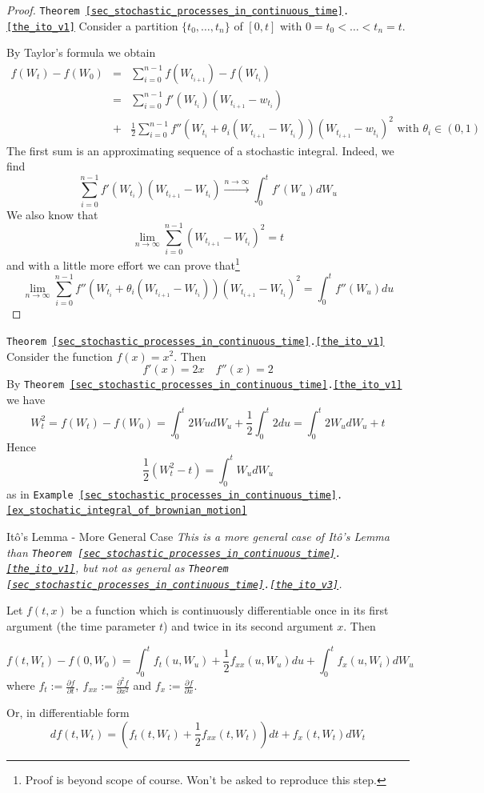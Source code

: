\documentclass[11pt,a4paper]{article}
\begin{document}
  \begin{proof}{\texttt{Theorem \ref{sec_stochastic_processes_in_continuous_time}.\ref{the_ito_v1}}}
    Consider a partition $\{t_0,\dots,t_n\}$ of $[0,t]$ with $0=t_0<\dots<t_n=t$.
    \par By Taylor's formula we obtain
    \[\begin{array}{rcl}
      f(W_t)-f(W_0)&=&\sum_{i=0}^{n-1}f(W_{t_{i+1}})-f(W_{t_i})\\
      &=&\sum_{i=0}^{n-1}f'(W_{t_i})(W_{t_{i+1}}-w_{t_i})\\
      &+&\frac12\sum_{i=0}^{n-1}f''(W_{t_i}+\theta_i(W_{t_{i+1}}-W_{t_i}))(W_{t_{i+1}}-w_{t_i})^2\text{ with }\theta_i\in(0,1)
    \end{array}\]
    The first sum is an approximating sequence of a stochastic integral. Indeed, we find
    \[ \sum_{i=0}^{n-1}f'(W_{t_i})(W_{t_{i+1}}-W_{t_i})\overset{n\to\infty}\longrightarrow\int_0^tf'(W_u)dW_u \]
    We also know that
    \[ \lim_{n\to\infty}\sum_{i=0}^{n-1}(W_{t_{i+1}}-W_{t_i})^2=t \]
    and with a little more effort we can prove that\footnote{Proof is beyond scope of course. Won't be asked to reproduce this step.}
    \[ \lim_{n\to\infty}\sum_{i=0}^{n-1}f''(W_{t_i}+\theta_i(W_{t_{i+1}}-W_{t_i}))(W_{t_{i+1}}-W_{t_i})^2=\int_0^tf''(W_u)du \]
  \end{proof}

  \begin{example}{\texttt{Theorem \ref{sec_stochastic_processes_in_continuous_time}.\ref{the_ito_v1}}}
    Consider the function $f(x)=x^2$. Then
    \[ f'(x)=2x\quad f''(x)=2 \]
    By \texttt{Theorem \ref{sec_stochastic_processes_in_continuous_time}.\ref{the_ito_v1}} we have
    \[ W_t^2=f(W_t)-f(W_0)=\int_0^t2WudW_u+\frac12\int_0^t 2du=\int_0^t2W_udW_u+t \]
    Hence
    \[ \frac12(W_t^2-t)=\int_0^tW_udW_u \]
    as in \texttt{Example \ref{sec_stochastic_processes_in_continuous_time}.\ref{ex_stochatic_integral_of_brownian_motion}}
  \end{example}

  \begin{theorem}{It\^o's Lemma - More General Case}\label{the_ito_v2}
    \textit{This is a more general case of It\^o's Lemma than \texttt{Theorem \ref{sec_stochastic_processes_in_continuous_time}.\ref{the_ito_v1}}, but not as general as \texttt{Theorem \ref{sec_stochastic_processes_in_continuous_time}.\ref{the_ito_v3}}.}
    \par Let $f(t,x)$ be a function which is continuously differentiable once in its first argument (the time parameter $t$) and twice in its second argument $x$. Then

    \[ f(t,W_t)-f(0,W_0)=\int_0^tf_t(u,W_u)+\frac12 f_{xx}(u,W_u)du +\int_0^tf_x(u,W_i)dW_u\]
    where $f_t:=\frac{\partial f}{\partial t},\ f_{xx}:=\frac{\partial^2 f}{\partial x^2}$ and $f_x:=\frac{\partial f}{\partial x}$.
    \par Or, in differentiable form
    \[ df(t,W_t)=(f_t(t,W_t)+\frac12f_{xx}(t,W_t))dt+f_x(t,W_t)dW_t \]
  \end{theorem}
\end{document}
